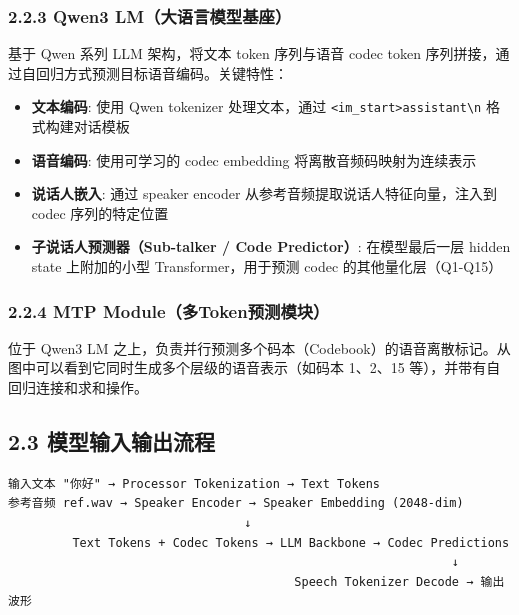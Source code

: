 \documentclass[
  english,
  letterpaper,
  DIV=11,
  numbers=noendperiod]{scrartcl}
\providecommand{\tightlist}{%
  \setlength{\itemsep}{0pt}\setlength{\parskip}{0pt}}
\begin{document}
\subsubsection{2.2.3 Qwen3
LM（大语言模型基座）}\label{qwen3-lmux5927ux8bedux8a00ux6a21ux578bux57faux5ea7}

基于 Qwen 系列 LLM 架构，将文本 token 序列与语音 codec token
序列拼接，通过自回归方式预测目标语音编码。关键特性：

\begin{itemize}
\tightlist
\item
  \textbf{文本编码}: 使用 Qwen tokenizer 处理文本，通过
  \texttt{\textless{}\textbar{}im\_start\textbar{}\textgreater{}assistant\textbackslash{}n}
  格式构建对话模板
\item
  \textbf{语音编码}: 使用可学习的 codec embedding
  将离散音频码映射为连续表示
\item
  \textbf{说话人嵌入}: 通过 speaker encoder
  从参考音频提取说话人特征向量，注入到 codec 序列的特定位置
\item
  \textbf{子说话人预测器（Sub-talker / Code Predictor）}: 在模型最后一层
  hidden state 上附加的小型 Transformer，用于预测 codec
  的其他量化层（Q1-Q15）
\end{itemize}

\subsubsection{2.2.4 MTP
Module（多Token预测模块）}\label{mtp-moduleux591atokenux9884ux6d4bux6a21ux5757}

位于 Qwen3 LM
之上，负责并行预测多个码本（Codebook）的语音离散标记。从图中可以看到它同时生成多个层级的语音表示（如码本
1、2、15 等），并带有自回归连接和求和操作。

\subsection{2.3
模型输入输出流程}\label{ux6a21ux578bux8f93ux5165ux8f93ux51faux6d41ux7a0b}

\begin{verbatim}
输入文本 "你好" → Processor Tokenization → Text Tokens
参考音频 ref.wav → Speaker Encoder → Speaker Embedding (2048-dim)
                                 ↓
         Text Tokens + Codec Tokens → LLM Backbone → Codec Predictions
                                                              ↓
                                        Speech Tokenizer Decode → 输出波形
\end{verbatim}
\end{document}
